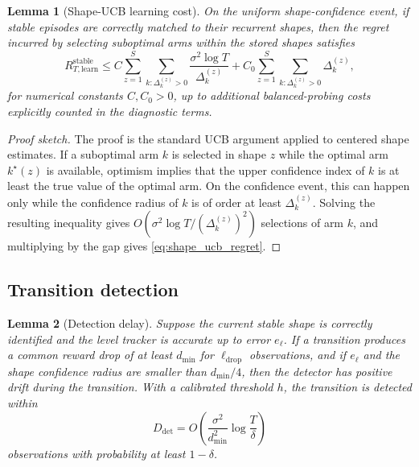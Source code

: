 \documentclass[11pt]{article}
\newtheorem{lemma}{Lemma}
\begin{document}
\begin{lemma}[Shape-UCB learning cost]
\label{lem:shape_ucb_regret}
On the uniform shape-confidence event, if stable episodes are correctly matched to their recurrent shapes, then the regret incurred by selecting suboptimal arms within the stored shapes satisfies
\begin{equation}
\label{eq:shape_ucb_regret}
R_{T,\mathrm{learn}}^{\mathrm{stable}}
\leq
C
\sum_{z=1}^{S}
\sum_{k:\Delta_k^{(z)}>0}
\frac{\sigma^2\log T}{\Delta_k^{(z)}}
+
C_0
\sum_{z=1}^{S}
\sum_{k:\Delta_k^{(z)}>0}
\Delta_k^{(z)},
\end{equation}
for numerical constants $C,C_0>0$, up to additional balanced-probing costs explicitly counted in the diagnostic terms.
\end{lemma}

\begin{proof}[Proof sketch]
The proof is the standard UCB argument applied to centered shape estimates. If a suboptimal arm $k$ is selected in shape $z$ while the optimal arm $k^\star(z)$ is available, optimism implies that the upper confidence index of $k$ is at least the true value of the optimal arm. On the confidence event, this can happen only while the confidence radius of $k$ is of order at least $\Delta_k^{(z)}$. Solving the resulting inequality gives $O(\sigma^2\log T/(\Delta_k^{(z)})^2)$ selections of arm $k$, and multiplying by the gap gives \eqref{eq:shape_ucb_regret}.
\end{proof}

\subsection{Transition detection}
\label{subsec:detection_proof}

\begin{lemma}[Detection delay]
\label{lem:detection_delay}
Suppose the current stable shape is correctly identified and the level tracker is accurate up to error $e_{\ell}$. If a transition produces a common reward drop of at least $d_{\min}$ for $\ell_{\mathrm{drop}}$ observations, and if $e_{\ell}$ and the shape confidence radius are smaller than $d_{\min}/4$, then the detector has positive drift during the transition. With a calibrated threshold $h$, the transition is detected within
\begin{equation}
\label{eq:detection_delay}
D_{\mathrm{det}}
=
O\left(
\frac{\sigma^2}{d_{\min}^2}
\log\frac{T}{\delta}
\right)
\end{equation}
observations with probability at least $1-\delta$.
\end{lemma}
\end{document}
